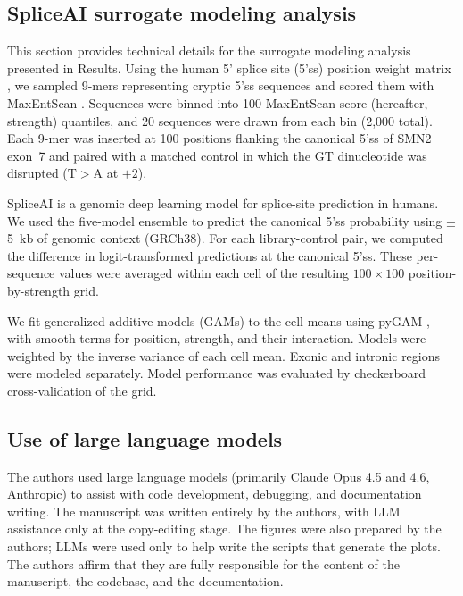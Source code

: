 \documentclass[pdflatex,sn-vancouver-num,referee,oneside]{sn-jnl}
\newif\ifshowquoted
\newcommand{\quoted}[1]{\ifshowquoted\textcolor{quotedtext}{#1}\else#1\fi}
\begin{document}
\subsection*{SpliceAI surrogate modeling analysis}\label{subsec:spliceai-surrogate-analysis}

This section provides technical details for the surrogate modeling analysis presented in Results. Using the human 5' splice site (5'ss) position weight matrix \citep{Wong2018quantitative}, we sampled 9-mers representing cryptic 5'ss sequences and scored them with MaxEntScan \citep{Yeo2004me}. Sequences were binned into 100 MaxEntScan score (hereafter, strength) quantiles, and 20 sequences were drawn from each bin (2,000 total). Each 9-mer was inserted at 100 positions flanking the canonical 5'ss of SMN2 exon~7 and paired with a matched control in which the GT dinucleotide was disrupted (T$>$A at $+2$).

\quoted{SpliceAI \citep{Jaganathan2019ps} is a genomic deep learning model for splice-site prediction in humans. We used the five-model ensemble to predict the canonical 5'ss probability using $\pm$5~kb of genomic context (GRCh38).} For each library-control pair, we computed the difference in logit-transformed predictions at the canonical 5'ss. These per-sequence values were averaged within each cell of the resulting $100 \times 100$ position-by-strength grid.

We fit generalized additive models (GAMs) to the cell means using pyGAM \citep{Serven2018pg}, with smooth terms for position, strength, and their interaction. Models were weighted by the inverse variance of each cell mean. Exonic and intronic regions were modeled separately. Model performance was evaluated by checkerboard cross-validation of the grid.

\subsection*{Use of large language models}\label{subsec:llm-disclosure}

\quoted{The authors used large language models (primarily Claude Opus 4.5 and 4.6, Anthropic) to assist with code development, debugging, and documentation writing. The manuscript was written entirely by the authors, with LLM assistance only at the copy-editing stage. The figures were also prepared by the authors; LLMs were used only to help write the scripts that generate the plots. The authors affirm that they are fully responsible for the content of the manuscript, the codebase, and the documentation.} 
\end{document}
